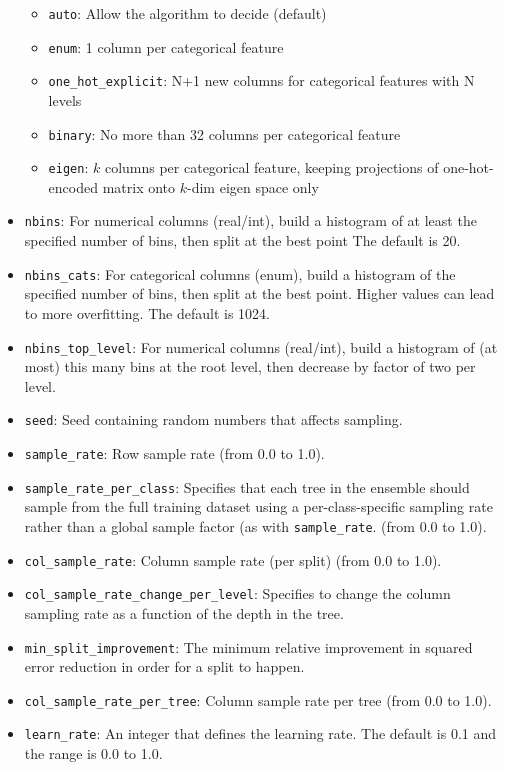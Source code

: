 \begin{itemize}
\begin{itemize}
\item \texttt{auto}: Allow the algorithm to decide (default)
\item \texttt{enum}: 1 column per categorical feature
\item \texttt{one\_hot\_explicit}: N+1 new columns for categorical features with N levels
\item \texttt{binary}: No more than 32 columns per categorical feature
\item \texttt{eigen}: $k$ columns per categorical feature, keeping projections of one-hot-encoded matrix onto $k$-dim eigen space only
\end{itemize}
\item {\texttt{nbins}}: For numerical columns (real/int), build a histogram of at least the specified number of bins, then split at the best point The default is 20.
\item {\texttt{nbins\_cats}}: For categorical columns (enum), build a histogram of the specified number of bins, then split at the best point. Higher values can lead to more overfitting.  The default is 1024. \label{nbins_cats}
\item {\texttt{nbins\_top\_level}}: For numerical columns (real/int), build a histogram of (at most) this many bins at the root level, then decrease by factor of two per level.
\item {\texttt{seed}}: Seed containing random numbers that affects sampling.
\item {\texttt{sample\_rate}}: Row sample rate (from 0.0 to 1.0). 
\item {\texttt{sample\_rate\_per\_class}}: Specifies that each tree in the ensemble should sample from the full training dataset using a per-class-specific sampling rate rather than a global sample factor (as with {\texttt{sample\_rate}}. (from 0.0 to 1.0). 
\item {\texttt{col\_sample\_rate}}: Column sample rate (per split) (from 0.0 to 1.0). 
\item {\texttt{col\_sample\_rate\_change\_per\_level}}: Specifies to change the column sampling rate as a function of the depth in the tree.
\item {\texttt{min\_split\_improvement}}: The minimum relative improvement in squared error reduction in order for a split to happen. 
\item {\texttt{col\_sample\_rate\_per\_tree}}: Column sample rate per tree (from 0.0 to 1.0). 
\item {\texttt{learn\_rate}}: An integer that defines the learning rate. The default is 0.1 and the range is 0.0 to 1.0.

\end{itemize}
